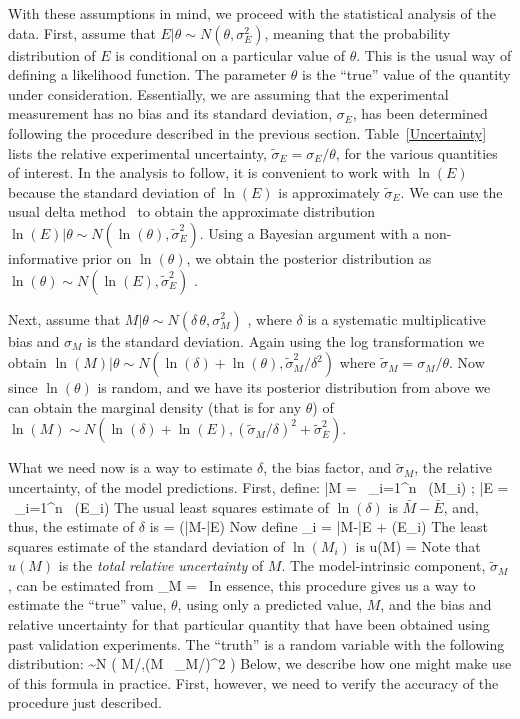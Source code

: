 With these assumptions in mind, we proceed with the statistical analysis of the data.
First, assume that $E|\theta \sim N(\theta,\sigma_E^2)$, meaning that the probability distribution of $E$
is conditional on a particular value of $\theta$. This is the usual way of defining a likelihood function. The parameter $\theta$ is the ``true'' value of the quantity under
consideration. Essentially, we are assuming that the experimental measurement has no bias and its standard deviation, $\sigma_E$, has been
determined following the procedure described in the
previous section. Table~\ref{Uncertainty} lists the relative experimental uncertainty, $\tilde{\sigma}_E=\sigma_E/\theta$, for the various quantities of interest.
In the analysis to follow, it is convenient to work with $\ln(E)$ because the standard deviation of $\ln(E)$ is approximately $\tilde{\sigma}_E$.
We can use the usual delta method~\cite{delta_method} to obtain the approximate distribution $\ln(E)|\theta \sim N(\ln(\theta),\tilde{\sigma}_E^2)$.
Using a Bayesian argument with a non-informative prior on $\ln(\theta)$, we obtain the posterior distribution as $\ln(\theta) \sim N(\ln(E),\tilde{\sigma}_E^2)$ .

Next, assume that $M|\theta \sim N(\delta \, \theta,\sigma_M^2)$ , where $\delta$ is a systematic multiplicative bias and $\sigma_M$ is the standard deviation.
Again using the log transformation we obtain $\ln(M)|\theta \sim N(\ln(\delta)+\ln(\theta),\tilde{\sigma}_M^2/\delta^2)$
where $\tilde{\sigma}_M=\sigma_M/\theta$. Now since $\ln(\theta)$ is random, and we have its posterior distribution from above we can obtain the marginal density
(that is for any $\theta$) of $\ln(M) \sim N(\ln(\delta)+\ln(E),(\tilde{\sigma}_M/\delta)^2+\tilde{\sigma}_E^2)$.

What we need now is a way to estimate $\delta$, the bias factor, and $\tilde{\sigma}_M$, the relative uncertainty, of the model predictions. First, define:
\be \bar{M} =  \, \sum_{i=1}^n \, \ln(M_i)  \quad ; \quad \bar{E} =  \, \sum_{i=1}^n \, \ln(E_i) \ee
The usual least squares estimate of $\ln(\delta)$ is $\bar{M}-\bar{E}$, and, thus, the estimate of $\delta$ is
\be \hat{\delta} = \exp(\bar{M}-\bar{E}) \ee
Now define
\be {}_i = \bar{M}-\bar{E} + \ln(E_i) \ee
The least squares estimate of the standard deviation of $\ln(M_i)$ is
\be u(M) =  \approx {} \ee
Note that $u(M)$ is the {\em total relative uncertainty} of $M$.
The model-intrinsic component, $\tilde{\sigma}_M$, can be estimated from
\be \tilde{\sigma}_M = \hat{\delta} \,  \label{model_error} \ee
In essence, this procedure gives us a way to estimate the ``true'' value, $\theta$, using only a predicted value, $M$, and the bias and relative uncertainty
for that particular quantity that have been obtained using past validation experiments. The ``truth'' is a random variable with the following distribution:
\be \theta \sim N \left( M/\delta,(M \, \tilde{\sigma}_M/\delta)^2 \right) \label{truth} \ee
Below, we describe how one might make use of this formula in practice. First, however, we need to verify the accuracy of the procedure just described.

